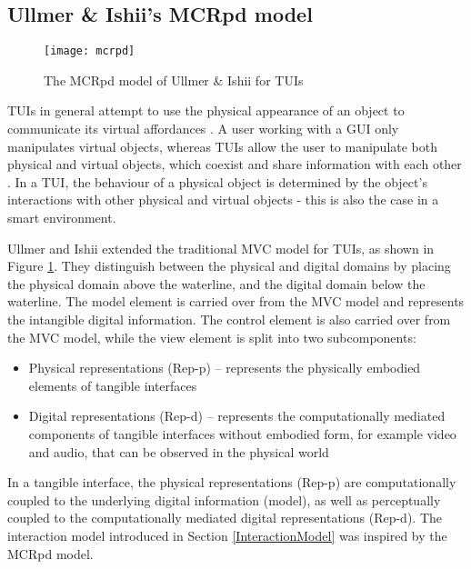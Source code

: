 

\subsection{Ullmer \& Ishii's MCRpd model}
\label{ullmer}
\begin{figure}
	\centering
	\centerline{\texttt{[image: mcrpd]}}
	\caption{The MCRpd model of Ullmer \& Ishii for \acp{TUI}}
	\label{mcrpd}
\end{figure}

\acp{TUI} in general attempt to use the physical appearance of an object to communicate its virtual affordances \cite{Bellotti2002}. A user working with a \ac{GUI} only manipulates virtual objects, whereas \acp{TUI} allow the user to manipulate both physical and virtual objects, which coexist and share information with each other \cite{Shaer2004}. In a \ac{TUI}, the behaviour of a physical object is determined by the object's interactions with other physical and virtual objects - this is also the case in a smart environment.

Ullmer and Ishii \cite{Ullmer2000} extended the traditional \ac{MVC} model for \acp{TUI}, as shown in Figure \ref{mcrpd}. They distinguish between the physical and digital domains by placing the physical domain above the waterline, and the digital domain below the waterline. The model element is carried over from the \ac{MVC} model and represents the intangible digital information. The control element is also carried over from the \ac{MVC} model, while the view element is split into two subcomponents: 

\begin{itemize}
	\item Physical representations (Rep-p) -- represents the physically embodied elements of tangible interfaces
	\item Digital representations (Rep-d) -- represents the computationally mediated components of tangible interfaces without embodied form, for example video and audio, that can be observed in the physical world  
\end{itemize}

In a tangible interface, the physical representations (Rep-p) are computationally coupled to the underlying digital information (model), as well as perceptually coupled to the computationally mediated digital representations (Rep-d). The interaction model introduced in Section \ref{InteractionModel} was inspired by the \ac{MCRpd} model.

